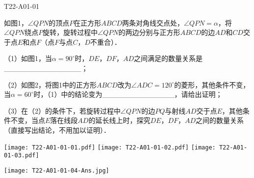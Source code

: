 
\begin{defproblem}{T22-A01-01}%
\begin{onlyproblem}%
如图1，$\angle QPN$的顶点$P$在正方形$ABCD$两条对角线交点处，$\angle QPN=\alpha $，将$\angle QPN$绕点$P$旋转，旋转过程中$\angle QPN$的两边分别与正方形$ABCD$的边$AD$和$CD$交于点$E$和点$F$（点$F$与点$C$，$D$不重合）．

（1）如图1，当$\alpha =90^{\circ }$时，$DE$，$DF$，$AD$之间满足的数量关系是{\_}{\_}{\_}{\_}{\_}{\_}{\_}{\_}{\_}{\_}{\_}{\_}{\_}{\_}{\_}；

（2）如图2，将图1中的正方形$ABCD$改为$\angle ADC=120^{\circ }$的菱形，其他条件不变，当$\alpha =60^{\circ }$时，（1）中的结论变为{\_}{\_}{\_}{\_}{\_}{\_}{\_}{\_}{\_}{\_}{\_}{\_}{\_}{\_}，请给出证明；

（3）在（2）的条件下，若旋转过程中$\angle QPN$的边$PQ$与射线$AD$交于点$E$，其他条件不变，当点$E$落在线段$AD$的延长线上时，探究$DE$，$DF$，$AD$之间的数量关系（直接写出结论，不用加以证明）．
\begin{center}
\texttt{[image: T22-A01-01-01.pdf]}\qquad
\texttt{[image: T22-A01-01-02.pdf]}\qquad
\texttt{[image: T22-A01-01-03.pdf]}
\end{center}

\end{onlyproblem}%
\begin{onlysolution}%
\begin{center}
\texttt{[image: T22-A01-01-04-Ans.jpg]}
\end{center}
\end{onlysolution}%
\end{defproblem}

